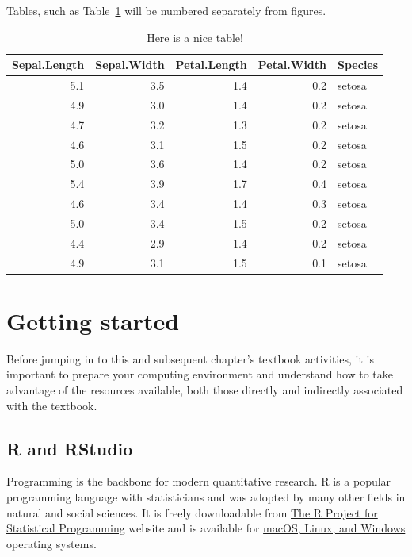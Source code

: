 \documentclass[
  letterpaper,
]{latex/krantz}
\begin{document}
Tables, such as Table~\ref{tbl-test-table} will be numbered separately
from figures.

\hypertarget{tbl-test-table}{}
\begin{table}
\caption{\label{tbl-test-table}Here is a nice table! }\tabularnewline

\centering
\begin{tabular}{r|r|r|r|l}
\hline
Sepal.Length & Sepal.Width & Petal.Length & Petal.Width & Species\\
\hline
5.1 & 3.5 & 1.4 & 0.2 & setosa\\
\hline
4.9 & 3.0 & 1.4 & 0.2 & setosa\\
\hline
4.7 & 3.2 & 1.3 & 0.2 & setosa\\
\hline
4.6 & 3.1 & 1.5 & 0.2 & setosa\\
\hline
5.0 & 3.6 & 1.4 & 0.2 & setosa\\
\hline
5.4 & 3.9 & 1.7 & 0.4 & setosa\\
\hline
4.6 & 3.4 & 1.4 & 0.3 & setosa\\
\hline
5.0 & 3.4 & 1.5 & 0.2 & setosa\\
\hline
4.4 & 2.9 & 1.4 & 0.2 & setosa\\
\hline
4.9 & 3.1 & 1.5 & 0.1 & setosa\\
\hline
\end{tabular}
\end{table}

\hypertarget{getting-started}{%
\section*{Getting started}\label{getting-started}}


Before jumping in to this and subsequent chapter's textbook activities,
it is important to prepare your computing environment and understand how
to take advantage of the resources available, both those directly and
indirectly associated with the textbook.

\hypertarget{r-and-rstudio}{%
\subsection*{R and RStudio}\label{r-and-rstudio}}

Programming is the backbone for modern quantitative research. R is a
popular programming language with statisticians and was adopted by many
other fields in natural and social sciences. It is freely downloadable
from \href{https://www.r-project.org/}{The R Project for Statistical
Programming} website and is available for
\href{https://cloud.r-project.org/}{macOS, Linux, and Windows} operating
systems.
\end{document}
